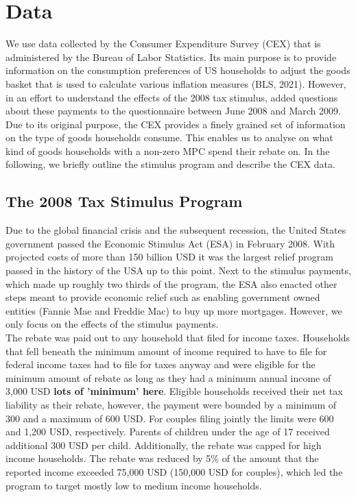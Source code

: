 \section{Data} \label{sec:data}
We use data collected by the Consumer Expenditure Survey (CEX) that is administered by the Bureau of Labor Statistics. Its main purpose is to provide information on the consumption preferences of US households to adjust the goods basket that is used to calculate various inflation measures (BLS, 2021). However, in an effort to understand the effects of the 2008 tax stimulus, \cite{parker_etal_13} added questions about these payments to the questionnaire between June 2008 and March 2009.  Due to its original purpose, the CEX provides a finely grained set of information on the type of goods households consume. This enables us to analyse on what kind of goods households with a non-zero MPC spend their rebate on. In the following, we briefly outline the stimulus program and describe the CEX data. 

\subsection{The 2008 Tax Stimulus Program} 
Due to the global financial crisis and the subsequent recession, the United States government passed the Economic Stimulus Act (ESA) in February 2008. With projected costs of more than 150 billion USD it was the largest relief program passed in the history of the USA up to this point. Next to the stimulus payments, which made up roughly two thirds of the program, the ESA also enacted other steps meant to provide economic relief such as enabling government owned entities (Fannie Mae and Freddie Mac) to buy up more mortgages. However, we only focus on the effects of the stimulus payments. \\
The rebate was paid out to any household that filed for income taxes. Households that fell beneath the minimum amount of income required to have to file for federal income taxes had to file for taxes anyway and were eligible for the minimum amount of rebate as long as they had a minimum annual income of 3,000 USD \textbf{lots of 'minimum' here}. Eligible households received their net tax liability as their rebate, however, the payment were bounded by a minimum of 300 and a maximum of 600 USD. For couples filing jointly the limits were 600 and 1,200 USD, respectively. Parents of children under the age of 17 received additional 300 USD per child. Additionally, the rebate was capped for high income households. The rebate was reduced by 5\% of the amount that the reported income exceeded 75,000 USD (150,000 USD for couples), which led the program to target mostly low to medium income households.

